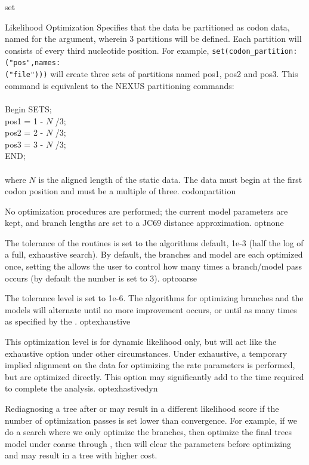 \begin{command}{set}{}
\begin{arguments}
\begin{argumentgroup}{Likelihood Optimization}
{Specifies that the data be partitioned as codon data, named for the \poystring 
argument, wherein $3$ partitions will be defined.  Each partition will consists 
of every third nucleotide position.  For example, \texttt{set(codon\_partition:("pos",names:\\("file")))}
will create three sets of partitions named pos1, pos2 and pos3. This command 
is equivalent to the NEXUS 
partitioning commands:
\\
\\
Begin SETS;\\
pos1 = 1 - $N$ /3;\\
pos2 = 2 - $N$ /3;\\
pos3 = 3 - $N$ /3;\\
END;\\
\\
where $N$ is the aligned length of the static data. The data must begin at the 
first codon position and must be a multiple of three.}
{codonpartition}

{No optimization procedures are performed; the current model
parameters are kept, and branch lengths are set to a JC69
distance approximation.}
{optnone}

{The tolerance of the routines is set to the algorithms 
default, 1e-3 (half the log of a full, exhaustive search). 
By default, the branches and model are each optimized 
once, setting the \poyint allows the user to control how 
many times a branch/model pass occurs (by default the 
number is set to 3).}
{optcoarse}

{The tolerance level is set to 1e-6. The algorithms for 
optimizing branches and the models will alternate until 
no more improvement occurs, or until as many times as 
specified by the \poyint.}
{optexhaustive}

{This optimization level is for dynamic likelihood only, but will act like the
exhaustive option under other circumstances. Under exhaustive,
a temporary implied alignment on the data for optimizing the rate parameters
is performed, but are optimized directly. This option may significantly
add to the time required to complete the analysis.}
{optexhastivedyn}

\begin{statement}
Rediagnosing a tree after  or
 may result in a different likelihood score if
the number of optimization passes is set lower than convergence.
For example, if we do a search where we only optimize the
branches, then optimize the final trees model under coarse
through , then \poy will clear the
parameters before optimizing and may result in a tree with
higher cost.
\end{statement}


\end{argumentgroup}
\end{arguments}
\end{command}
